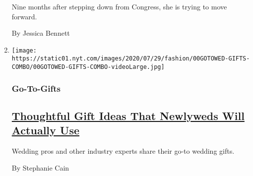 \begin{enumerate}
  Nine months after stepping down from Congress, she is trying to move
  forward.

  By Jessica Bennett
\item
  \texttt{[image: https://static01.nyt.com/images/2020/07/29/fashion/00GOTOWED-GIFTS-COMBO/00GOTOWED-GIFTS-COMBO-videoLarge.jpg]}

  \hypertarget{go-to-gifts}{%
  \subsubsection{Go-To-Gifts}\label{go-to-gifts}}

  \hypertarget{thoughtful-gift-ideas-that-newlyweds-will-actually-use}{%
  \subsection{\texorpdfstring{\href{/2020/08/08/fashion/weddings/thoughtful-gift-ideas-that-newlyweds-will-actually-use.html}{Thoughtful
  Gift Ideas That Newlyweds Will Actually
  Use}}{Thoughtful Gift Ideas That Newlyweds Will Actually Use}}\label{thoughtful-gift-ideas-that-newlyweds-will-actually-use}}

  Wedding pros and other industry experts share their go-to wedding
  gifts.

  By Stephanie Cain
\end{enumerate}

